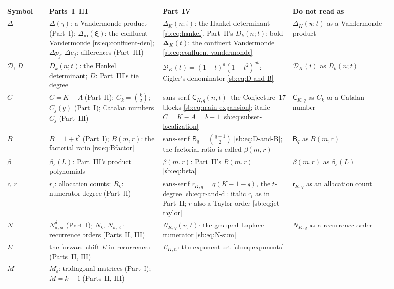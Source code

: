 \documentclass[11pt]{article}
\theoremstyle{definition}
\theoremstyle{remark}
\newcommand{\eps}{\varepsilon}
\newcommand{\Den}{\mathcal D}
\newcommand{\ConfDelta}{\boldsymbol\Delta}
\newcommand{\Cblock}{\mathsf C}
\newcommand{\Btri}{\mathsf B}
\newcommand{\rdeg}{\mathsf r}
\theoremstyle{definition}
\theoremstyle{plain}
\numberwithin{equation}{section}
\begin{document}
{\small
\begin{longtable}{@{}>{\raggedright\arraybackslash}p{0.10\linewidth}>{\raggedright\arraybackslash}p{0.27\linewidth}>{\raggedright\arraybackslash}p{0.31\linewidth}>{\raggedright\arraybackslash}p{0.24\linewidth}@{}}
\toprule
Symbol & Parts~I--III & Part~IV & Do not read as\\
\midrule
\endhead
$\Delta$ &
$\Delta(\eta)$: a Vandermonde product (Part~I);
$\Delta_{\boldsymbol m}(\boldsymbol\xi)$: the confluent Vandermonde
\eqref{rs:eq:confluent-den}; $\Delta p_j$, $\Delta e_j$: differences
(Part~III) &
$\Delta_K(n;t)$: the Hankel determinant \eqref{sb:eq:hankel}, Part~II's
$D_k(n;t)$; bold $\ConfDelta_K(t)$: the confluent Vandermonde
\eqref{sb:eq:confluent-vandermonde} &
$\Delta_K(n;t)$ as a Vandermonde product\\[3pt]
$\Den$, $D$ &
$D_k(n;t)$: the Hankel determinant; $D$: Part~III's tie degree &
$\Den_K(t)=(1-t)^a(1-t^2)^{ab}$: Cigler's denominator
\eqref{sb:eq:D-and-B} &
$\Den_K(t)$ as $D_k(n;t)$\\[3pt]
$C$ &
$C=K-A$ (Part~II); $C_k=\binom k2$; $C_j(y)$ (Part~I); Catalan numbers $C_j$
(Part~III) &
sans-serif $\Cblock_{K,q}(n,t)$: the Conjecture~17 blocks
\eqref{sb:eq:main-expansion}; italic $C=K-A=b+1$ \eqref{sb:eq:subset-localization} &
$\Cblock_{K,q}$ as $C_k$ or a Catalan number\\[3pt]
$B$ &
$B=1+t^2$ (Part~I); $B(m,r)$: the factorial ratio \eqref{rs:eq:Bfactor} &
sans-serif $\Btri_q=\binom{q+1}2$ \eqref{sb:eq:D-and-B}; the factorial
ratio is called $\beta(m,r)$ &
$\Btri_q$ as $B(m,r)$\\[3pt]
$\beta$ &
$\beta_s(L)$: Part~III's product polynomials &
$\beta(m,r)$: Part~II's $B(m,r)$ \eqref{sb:eq:beta} &
$\beta(m,r)$ as $\beta_s(L)$\\[3pt]
$\mathsf r$, $r$ &
$r_i$: allocation counts; $R_k$: numerator degree (Part~II) &
sans-serif $\rdeg_{K,q}=q(K-1-q)$, the $t$-degree \eqref{sb:eq:r-and-d};
italic $r_i$ as in Part~II; $r$ also a Taylor order \eqref{sb:eq:jet-taylor} &
$\rdeg_{K,q}$ as an allocation count\\[3pt]
$N$ &
$N^\delta_{a,m}$ (Part~I); $N_k$, $N_{k,\ell}$: recurrence orders (Parts~II, III) &
$N_{K,q}(n,t)$: the grouped Laplace numerator \eqref{sb:eq:N-sum} &
$N_{K,q}$ as a recurrence order\\[3pt]
$E$ &
the forward shift $E$ in recurrences (Parts~II, III) &
$E_{K,n}$: the exponent set \eqref{sb:eq:exponents} &
---\\[3pt]
$M$ &
$M_\eps$: tridiagonal matrices (Part~I); $M=k-1$ (Parts~II, III) &

\end{longtable}}
\end{document}
